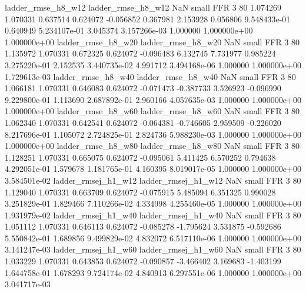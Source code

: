       ladder_rmse_h8_w12       ladder_rmse_h8_w12                   NaN      small      FFR                 3 80 1.074269       1.070331 0.637514       0.624072   -0.056852      0.367981      2.153928     0.056806   9.548433e-01  0.640949 5.234107e-01     3.045374   3.157266e-03            1.000000    1.000000e+00        1.000000e+00
      ladder_rmse_h8_w20       ladder_rmse_h8_w20                   NaN      small      FFR                 3 80 1.135972       1.070331 0.672325       0.624072   -0.096483      6.132745      7.731977     0.985224   3.275220e-01  2.152535 3.440735e-02     4.991712   3.494168e-06            1.000000    1.000000e+00        1.729613e-03
      ladder_rmse_h8_w40       ladder_rmse_h8_w40                   NaN      small      FFR                 3 80 1.066181       1.070331 0.646083       0.624072   -0.071473     -0.387733      3.526923    -0.096990   9.229800e-01  1.113690 2.687892e-01     2.960166   4.057635e-03            1.000000    1.000000e+00        1.000000e+00
      ladder_rmse_h8_w60       ladder_rmse_h8_w60                   NaN      small      FFR                 3 80 1.062340       1.070331 0.642541       0.624072   -0.064381     -0.746605      2.959509    -0.226020   8.217696e-01  1.105072 2.724825e-01     2.824736   5.988230e-03            1.000000    1.000000e+00        1.000000e+00
      ladder_rmse_h8_w80       ladder_rmse_h8_w80                   NaN      small      FFR                 3 80 1.128251       1.070331 0.665075       0.624072   -0.095061      5.411425      6.570252     0.794638   4.292051e-01  1.579678 1.181765e-01     4.160395   8.019017e-05            1.000000    1.000000e+00        3.584501e-02
     ladder_rmsej_h1_w12      ladder_rmsej_h1_w12                   NaN      small      FFR                 3 80 1.129040       1.070331 0.663709       0.624072   -0.075915      5.485094      6.351325     0.990028   3.251829e-01  1.829466 7.110266e-02     4.334998   4.255460e-05            1.000000    1.000000e+00        1.931979e-02
     ladder_rmsej_h1_w40      ladder_rmsej_h1_w40                   NaN      small      FFR                 3 80 1.051112       1.070331 0.646113       0.624072   -0.085278     -1.795624      3.531875    -0.592686   5.550842e-01  1.689856 9.499829e-02     4.832072   6.517110e-06            1.000000    1.000000e+00        3.141247e-03
     ladder_rmsej_h1_w60      ladder_rmsej_h1_w60                   NaN      small      FFR                 3 80 1.033229       1.070331 0.643853       0.624072   -0.090857     -3.466402      3.169683    -1.403199   1.644758e-01  1.678293 9.724174e-02     4.840913   6.297551e-06            1.000000    1.000000e+00        3.041717e-03
